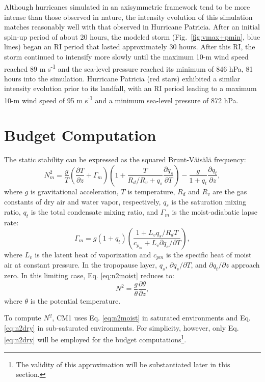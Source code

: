 \documentclass{ametsoc}
\begin{document}
Although hurricanes simulated in an axisymmetric framework tend to be more intense than those observed in nature, the intensity evolution of this simulation matches reasonably well with that observed in Hurricane Patricia.
After an initial spin-up period of about 20 hours, the modeled storm (Fig.~\ref{fig:vmax+pmin}, blue lines) began an RI period that lasted approximately 30 hours.
After this RI, the storm continued to intensify more slowly until the maximum 10-m wind speed reached 89 m s\textsuperscript{-1} and the sea-level pressure reached its minimum of 846 hPa, 81 hours into the simulation.
Hurricane Patricia (red stars) exhibited a similar intensity evolution prior to its landfall, with an RI period leading to a maximum 10-m wind speed of 95 m s\textsuperscript{-1} and a minimum sea-level pressure of 872 hPa.

 \section{Budget Computation}

The static stability can be expressed as the squared Brunt-V{\"a}is{\"a}l{\"a} frequency:
   \begin{equation} \label{eq:n2moist}
   N_m^2 = \frac{g}{T}\left(\frac{\partial T}{\partial z}+\Gamma_m\right)\left(1+\frac{T}{R_d/R_v+q_s}\frac{\partial q_s}{\partial T}\right)-\frac{g}{1+q_t}\frac{\partial q_t}{\partial z},
   \end{equation}
where $g$ is gravitational acceleration, $T$ is temperature, $R_d$ and $R_v$ are the gas constants of dry air and water vapor, respectively, $q_s$ is the saturation mixing ratio, $q_t$ is the total condensate mixing ratio, and $\Gamma_m$ is the moist-adiabatic lapse rate:
   \begin{equation} \label{eq:gamma_m}
   \Gamma_m = g(1+q_t)\left(\frac{1+L_vq_s/R_dT}{c_p_m +L_v\partial q_s/\partial T}\right),
   \end {equation}
where $L_v$ is the latent heat of vaporization and $c_{pm}$ is the specific heat of moist air at constant pressure.
In the tropopause layer, $q_s$, ${\partial q_s}/{\partial T}$, and ${\partial q_t}/{\partial z}$ approach zero. In this limiting case, Eq. \ref{eq:n2moist} reduces to:
   \begin{equation} \label{eq:n2dry}
   N^2 = \frac{g}{\theta}\frac{\partial \theta}{\partial z},
   \end{equation}
where $\theta$ is the potential temperature.

To compute $N^2$, CM1 uses Eq. \ref{eq:n2moist} in saturated environments and Eq. \ref{eq:n2dry} in sub-saturated environments. For simplicity, however, only Eq. \ref{eq:n2dry} will be employed for the budget computations\footnote{The validity of this approximation will be substantiated later in this section.}.
\end{document}
